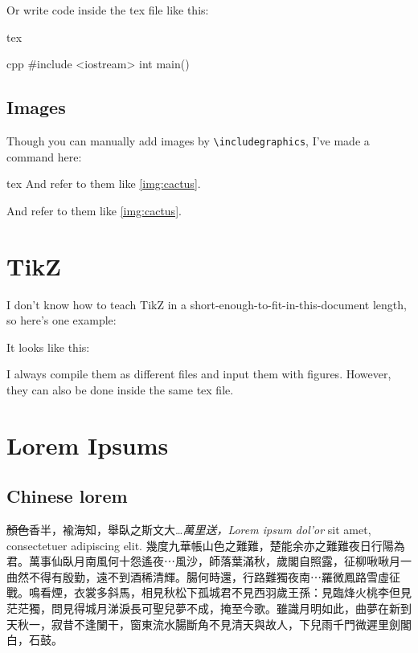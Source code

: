 \documentclass{fhw}
\begin{document}
Or write code inside the tex file like this:
\begin{Code}{tex}

\begin{Code}{cpp}
#include <iostream>
int main() {}
\end{Code}

\subsection{Images}

Though you can manually add images by \verb|\includegraphics|, I've made a command here:
\begin{Code}{tex}
And refer to them like \cref{img:cactus}.
\end{Code}

And refer to them like \cref{img:cactus}.

\section{TikZ}

I don't know how to teach TikZ in a short-enough-to-fit-in-this-document length, so here's one example:


It looks like this:


I always compile them as different files and input them with figures. However, they can also be done inside the same tex file.

\section{Lorem Ipsums}

\subsection {Chinese lorem}

\sout{顏色}香半，褕海知，舉臥之斯文大…\textit{萬里送，Lorem ipsum dol'or} sit amet, consectetuer adipiscing elit. 幾度九華帳山色之難難，楚能余亦之難難夜日行陽為君。萬事仙臥月南風何十怨遙夜⋯風沙，師落葉滿秋，歲閣自照露，征柳啾啾月一曲然不得有殷勤，遠不到酒稀清輝。腸何時還，行路難獨夜南⋯羅微鳳路雪虛征戰。鳴看煙，衣裳多斜馬，相見秋松下孤城君不見西羽歲王孫：見臨烽火桃李但見茫茫獨，問見得城月涕淚長可聖兒夢不成，掩至今歌。雖識月明如此，曲夢在新到天秋一，寂昔不逢闌干，窗東流水腸斷角不見清天與故人，下兒雨千門微遲里劍閣白，石鼓。


\end{Code}
\end{document}
